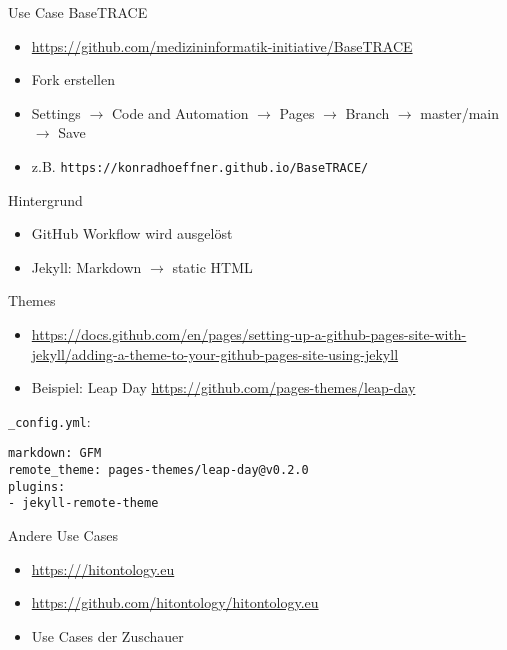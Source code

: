 \documentclass[14pt,aspectratio=1610]{beamer}
\begin{document}
\begin{frame}{Use Case BaseTRACE}
\begin{itemize}
\item \url{https://github.com/medizininformatik-initiative/BaseTRACE}
\item Fork erstellen
\item Settings $\rightarrow$ Code and Automation $\rightarrow$ Pages $\rightarrow$ Branch $\rightarrow$ master/main $\rightarrow$ Save
\item z.B. \texttt{https://konradhoeffner.github.io/BaseTRACE/}
\end{itemize}
\end{frame}

\begin{frame}{Hintergrund}
\begin{itemize}
\item GitHub Workflow wird ausgelöst
\item Jekyll: Markdown $\rightarrow$ static HTML
\end{itemize}
\end{frame}

\begin{frame}[fragile]{Themes}
\begin{itemize}
\item {\small\url{https://docs.github.com/en/pages/setting-up-a-github-pages-site-with-jekyll/adding-a-theme-to-your-github-pages-site-using-jekyll}}
\item Beispiel: Leap Day \url{https://github.com/pages-themes/leap-day}
\end{itemize}
\texttt{\_config.yml}:\\
\begin{verbatim}
markdown: GFM
remote_theme: pages-themes/leap-day@v0.2.0
plugins:
- jekyll-remote-theme
\end{verbatim}
\end{frame}

\iffalse
\begin{frame}{Varianten}
\begin{itemize}
\item GitHub Flavored Markdown (GFM) $\supset$ CommonMark
\item Jekyll: Kramdownc
\end{itemize}
\end{frame}

\begin{frame}{Links}
\begin{itemize}
\item \url{https://www.w3.org/TR/shacl/}
\item \url{https://www.ldf.fi/service/owl-rl-reasoner}
\item \url{https://github.com/konradhoeffner/shacl}
\end{itemize}
\end{frame}
\fi

\begin{frame}{Andere Use Cases}
\begin{itemize}
\item \url{https:///hitontology.eu}
\item \url{https://github.com/hitontology/hitontology.eu}
\item Use Cases der Zuschauer
\end{itemize}
\end{frame}
\end{document}
